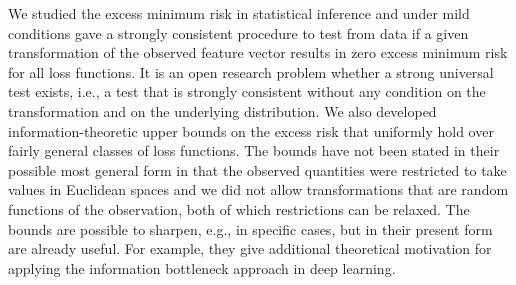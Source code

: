 \documentclass[11pt]{article}
\begin{document}
We studied the excess minimum risk in statistical inference and under mild conditions gave a strongly consistent procedure to test from data if a given transformation of the observed feature vector results in zero excess minimum risk for all loss functions. 
It is an open research problem whether  a strong universal test exists,  i.e., a test that is strongly consistent without any condition on the transformation and on the underlying distribution.
We also  developed information-theoretic upper bounds on the excess risk that uniformly hold over  fairly general classes of loss functions. 
The bounds have not been stated in their possible most general form in that the observed quantities were restricted to take values in Euclidean spaces and we did not allow  transformations that are random functions of the observation, both of which restrictions can be relaxed. 
The bounds are possible to sharpen, e.g., in specific cases, but in their  present form are already useful. For example, they give additional theoretical motivation for applying the information bottleneck approach in deep learning. 

 
\end{document}
